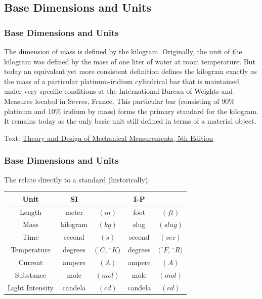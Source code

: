 \documentclass[fleqn]{ltx-talk} %
\newcommand{\sectionIsubsectionIIItitle}{Base Dimensions and Units}
\newcommand{\ublank}{\underline{\hspace{20mm}}}
\begin{document}
		\subsection{\sectionIsubsectionIIItitle}\label{sectionIsubsectionIII}
			\begin{frame} 
				\frametitle{\sectionIsubsectionIIItitle}
				\bigskip

				The dimension of mass is defined by the kilogram. Originally, the unit of the kilogram was defined
by the mass of one liter of water at room temperature. But today an equivalent yet more consistent
definition defines the kilogram exactly as the mass of a particular platinum-iridium cylindrical bar
that is maintained under very specific conditions at the International Bureau of Weights and
Measures located in Sevres, France. This particular bar (consisting of 90\% platinum and 10\%
iridium by mass) forms the primary standard for the kilogram. It remains today as the only basic unit
still defined in terms of a material object.

{\tiny Text: \underline{Theory and Design of Mechanical Measurements, 5th Edition}}


			\end{frame}	

			\begin{frame}[containsverbatim] 
				\frametitle{\sectionIsubsectionIIItitle}

				The {\BL \ublank \ublank} relate directly to a standard (historically).\vspc

\renewcommand{\arraystretch}{1.2}
\begin{tabular}{|c|cc|cc|} \hline
\textbf{Unit}&\textbf{SI}&&\textbf{I-P}&\\ \hline\hline
Length&meter&$(m)$&foot&$(ft)$\\ \hline
Mass&kilogram&$(kg)$&slug&$(slug)$ \\\hline
Time&second&$(s)$&second&$(sec)$\\ \hline
Temperature&degrees&$(^\circ C$, $^\circ K)$&degrees&$(^\circ F$, $^\circ R)$ \\ \hline
Current&ampere&$(A)$&ampere&$(A)$\\ \hline
Substance&mole&$(mol)$&mole&$(mol)$\\ \hline
Light Intensity&candela&$(cd)$&candela&$(cd)$\\ \hline
\end{tabular}

				
			\end{frame}	
\end{document}
